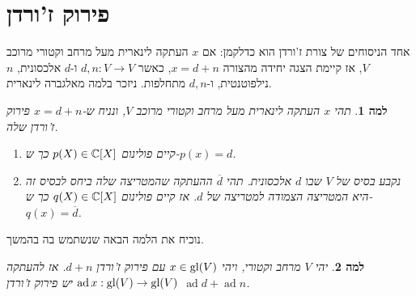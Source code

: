 \documentclass{report}
\theoremstyle{break}
\newtheorem{lemma}[lemma]{למה}
\theoremstyle{MyNonumberbreak}
\DeclareMathOperator{\ad}{ad} %
\begin{document}
\section{פירוק ז'ורדן}
אחד הניסוחים של צורת ז'ורדן הוא כדלקמן\footnotemark[1]: אם $x$ העתקה לינארית מעל מרחב וקטורי מרוכב $V$, אז קיימת הצגה יחידה מהצורה $x = d + n$, כאשר $d, n : V \to V$ ו-$d$ אלכסונית, $n$ נילפוטנטית, ו-$d, n$ מתחלפות. ניזכר בלמה מאלגברה לינארית\footnotemark[2].
\begin{lemma} \label{lemma:jordan-poly}
	תהי $x$ העתקה לינארית מעל מרחב וקטורי מרוכב $V$, ונניח ש-$x = d + n$ פירוק ז'ורדן שלה.
	\begin{enumerate}[label=(\alph*)]
		\item 
		קיים פולינום $p(X) \in \operatorname{\mathbb{C}}[X]$ כך ש-$p(x) = d$.
		\item
		נקבע בסיס של $V$ שבו $d$ אלכסונית. תהי $\overline{d}$ ההעתקה שהמטריצה שלה ביחס לבסיס זה היא המטריצה הצמודה למטריצה של $d$. אז קיים פולינום $q(X) \in \operatorname{\mathbb{C}}[X]$ כך ש-$q(x) = \overline{d}$.
	\end{enumerate}
\end{lemma}
נוכיח את הלמה הבאה שנשתמש בה בהמשך.
\begin{lemma} \label{lemma:jordan-adj}
	יהי $V$ מרחב וקטורי, ויהי $x \in \operatorname{gl}(V)$ עם פירוק ז'ורדן $d + n$. אז להעתקה $\ad x : \gl(V) \to \gl(V)$ יש פירוק ז'ורדן $\ad d + \ad n$.
\end{lemma}
\end{document}
